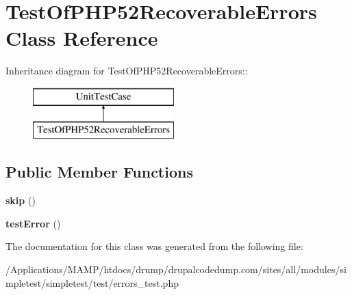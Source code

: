 \hypertarget{class_test_of_p_h_p52_recoverable_errors}{
\section{TestOfPHP52RecoverableErrors Class Reference}
\label{class_test_of_p_h_p52_recoverable_errors}
}
Inheritance diagram for TestOfPHP52RecoverableErrors::\begin{figure}[H]
\begin{center}
\leavevmode
\includegraphics[height=2cm]{class_test_of_p_h_p52_recoverable_errors}
\end{center}
\end{figure}
\subsection*{Public Member Functions}
\begin{DoxyCompactItemize}
\item 
\hypertarget{class_test_of_p_h_p52_recoverable_errors_ad1aa85b3ac60a6f867718ac911006660}{
{\bfseries skip} ()}
\label{class_test_of_p_h_p52_recoverable_errors_ad1aa85b3ac60a6f867718ac911006660}

\item 
\hypertarget{class_test_of_p_h_p52_recoverable_errors_a8c043331b054b7eba022989d04f45383}{
{\bfseries testError} ()}
\label{class_test_of_p_h_p52_recoverable_errors_a8c043331b054b7eba022989d04f45383}

\end{DoxyCompactItemize}


The documentation for this class was generated from the following file:\begin{DoxyCompactItemize}
\item 
/Applications/MAMP/htdocs/drump/drupalcodedump.com/sites/all/modules/simpletest/simpletest/test/errors\_\-test.php\end{DoxyCompactItemize}
